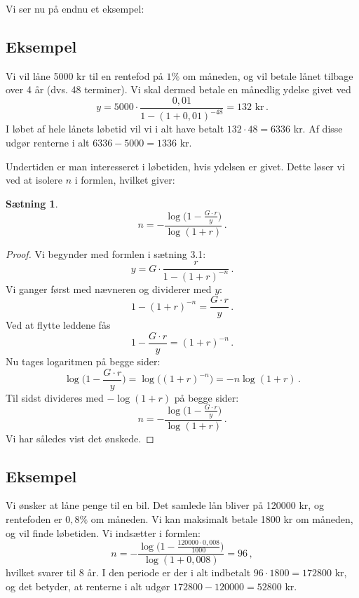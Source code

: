 \documentclass[12pt,oneside,a4paper]{article}
\newtheorem{thm}{Sætning}[section]
\begin{document}
Vi ser nu på endnu et eksempel:
\begin{tcolorbox}
\subsection*{Eksempel}
Vi vil låne 5000 kr til en rentefod på $1 \%$ om måneden, og vil betale lånet
tilbage over 4 år (dvs. 48 terminer).  Vi skal dermed betale en månedlig
ydelse givet ved
\[
    y = 5000\cdot\frac{0,01}{1-(1+0,01)^{-48}} = 132 \,\,\mbox {kr} \,. 
\]
I løbet af hele lånets løbetid vil vi i alt have betalt $132\cdot 48 = 6336$ kr. Af
disse udgør renterne i alt $6336-5000 = 1336$ kr.
\end{tcolorbox}

Undertiden er man interesseret i løbetiden, hvis ydelsen er givet.
Dette løser vi ved at isolere $n$ i formlen, hvilket giver:
\begin{tcolorbox}
\begin{thm}
\[
    n = -\frac{\log\big(1-\frac{G\cdot r}{y}\big)}{\log(1+r)} \,.
\]
\end{thm}
\begin{proof}
Vi begynder med formlen i sætning 3.1:
\[
    y = G\cdot\frac{r}{1-(1+r)^{-n}}\,.
\]
Vi ganger først med nævneren og dividerer med $y$:
\[
1-(1+r)^{-n} = \frac{G\cdot r}{y}\,.
\]
Ved at flytte leddene fås
\[
1 - \frac{G\cdot r}{y} =(1+r)^{-n}\,.
\]
Nu tages logaritmen på begge sider:
\[
\log\Big(1 - \frac{G\cdot r}{y}\Big) =\log\Big((1+r)^{-n}\Big) = -n\log(1+r)\,.
\]
Til sidst divideres med $-\log(1+r)$ på begge sider:
\[
n = -\frac{\log\big(1-\frac{G\cdot r}{y}\big)}{\log(1+r)} \,.
\]
Vi har således vist det ønskede.
\end{proof}
\end{tcolorbox}

\begin{tcolorbox}
\subsection*{Eksempel}
Vi ønsker at låne penge til en bil. Det samlede lån bliver på 120000 kr, og
rentefoden er $0,8\%$ om måneden. Vi kan maksimalt betale 1800 kr om
måneden, og vil finde løbetiden.  Vi indsætter i formlen:
\[
n = -\frac{\log\big(1-\frac{120000\cdot0,008}{1000}\big)}{\log(1+0,008)} = 96 \,,
\]
hvilket svarer til 8 år.
I den periode er der i alt indbetalt $96\cdot 1800 = 172800$ kr, og det betyder,
at renterne i alt udgør $172800-120000 = 52800$ kr.
\end{tcolorbox}
\end{document}
